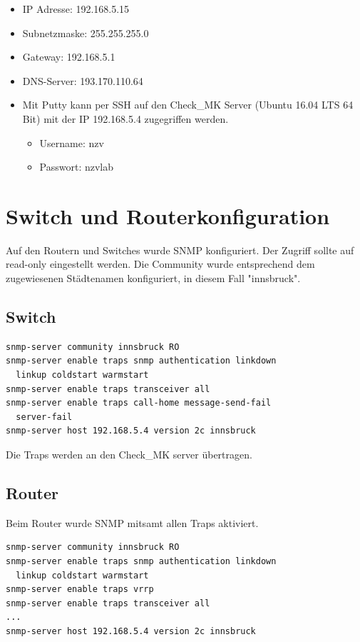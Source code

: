 \begin{itemize}
\item IP Adresse: 192.168.5.15 
\item Subnetzmaske: 255.255.255.0
\item Gateway: 192.168.5.1
\item DNS-Server: 193.170.110.64
\item Mit Putty kann per SSH auf den Check\_MK Server (Ubuntu 16.04 LTS 64 Bit) mit der IP 192.168.5.4 zugegriffen werden.
\begin{itemize}
\item Username: nzv
\item Passwort: nzvlab
\end{itemize}
\end{itemize}

\chapter{Switch und Routerkonfiguration}

Auf den Routern und Switches wurde \ac{SNMP} konfiguriert. Der Zugriff sollte auf read-only eingestellt werden. Die Community wurde entsprechend dem zugewiesenen Städtenamen konfiguriert, in diesem Fall "innsbruck".

\section{Switch}

\begin{lstlisting}[caption={SNMP-Config Switch},label={lst:switch},language={}]
snmp-server community innsbruck RO
snmp-server enable traps snmp authentication linkdown 
  linkup coldstart warmstart
snmp-server enable traps transceiver all
snmp-server enable traps call-home message-send-fail 
  server-fail
snmp-server host 192.168.5.4 version 2c innsbruck
\end{lstlisting}

Die Traps werden an den Check\_MK server übertragen.


\section{Router}

Beim Router wurde \ac{SNMP} mitsamt allen Traps aktiviert.

\begin{lstlisting}[caption={SNMP-Config Router},label={lst:router},language={}]
snmp-server community innsbruck RO
snmp-server enable traps snmp authentication linkdown 
  linkup coldstart warmstart
snmp-server enable traps vrrp
snmp-server enable traps transceiver all
...
snmp-server host 192.168.5.4 version 2c innsbruck
\end{lstlisting}

